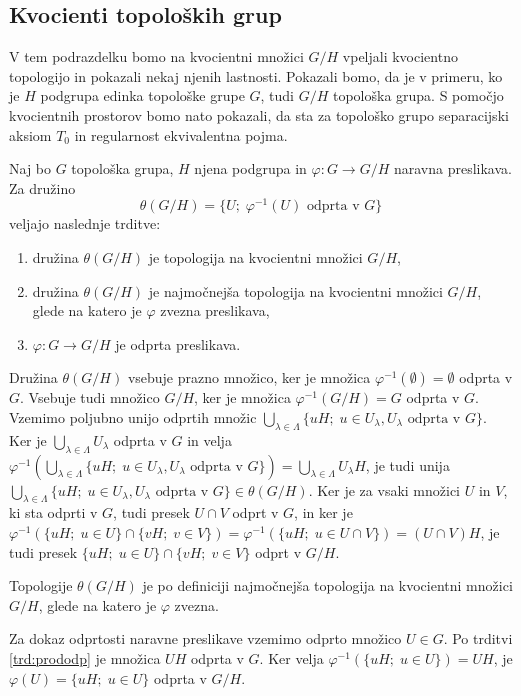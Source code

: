 \documentclass[mat1]{fmfdelo}
\begin{document}
\subsection{Kvocienti topoloških grup}
V tem podrazdelku bomo na kvocientni množici $G/H$ vpeljali kvocientno topologijo in pokazali nekaj njenih lastnosti. Pokazali bomo, da je v primeru, ko je $H$ podgrupa edinka topološke grupe $G$, tudi $G/H$ topološka grupa. S pomočjo kvocientnih prostorov bomo nato pokazali, da sta za topološko grupo separacijski aksiom $T_0$ in regularnost ekvivalentna pojma.

\begin{izrek}\label{izr:topkvocienta}
Naj bo $G$ topološka grupa, $H$ njena podgrupa in $\varphi\colon G \to G/H$ naravna preslikava. Za družino \[\theta(G/H) = \lbrace U ;\; \varphi^{-1}(U) \text{ odprta v } G \rbrace\]
veljajo naslednje trditve:
\begin{enumerate}
\item družina $\theta(G/H)$ je topologija na kvocientni množici $G/H$,
\item družina $\theta(G/H)$ je najmočnejša topologija na kvocientni množici $G/H$, glede na katero je $\varphi$ zvezna preslikava,
\item $\varphi: G \to G/H$ je odprta preslikava.
\end{enumerate}
\end{izrek}

\begin{dokaz}
Družina $\theta(G/H)$ vsebuje prazno množico, ker je množica $\varphi^{-1}(\emptyset) = \emptyset$ odprta v $G$. Vsebuje tudi množico $G/H$, ker je množica $\varphi^{-1}(G/H) = G$ odprta v $G$. Vzemimo poljubno unijo odprtih množic $\bigcup_{\lambda \in \Lambda}\lbrace uH ;\; u \in U_\lambda, U_\lambda \text{ odprta v } G\rbrace$. Ker je $\bigcup_{\lambda \in \Lambda} U_\lambda$ odprta v $G$ in velja $\varphi^{-1}(\bigcup_{\lambda \in \Lambda}\lbrace uH ;\; u \in U_\lambda, U_\lambda \text{ odprta v } G\rbrace) = \bigcup_{\lambda \in \Lambda} U_\lambda H$, je tudi unija $\bigcup_{\lambda \in \Lambda}\lbrace uH ;\; u \in U_\lambda, U_\lambda \text{ odprta v } G\rbrace \in \theta(G/H)$. Ker je za vsaki množici $U$ in $V$, ki sta odprti v $G$, tudi presek $U \cap V$ odprt v $G$, in ker je $\varphi^{-1}(\lbrace uH ;\; u \in U\rbrace \cap \lbrace vH ;\; v \in V \rbrace) = \varphi^{-1}(\lbrace uH ;\; u \in U \cap V \rbrace) = (U \cap V)H$, je tudi presek $\lbrace uH ;\; u \in U\rbrace \cap \lbrace vH ;\; v \in V \rbrace$ odprt v $G/H$.

Topologije $\theta(G/H)$ je po definiciji najmočnejša topologija na kvocientni množici $G/H$, glede na katero je $\varphi$ zvezna.

Za dokaz odprtosti naravne preslikave vzemimo odprto množico $U \in G$. Po trditvi \ref{trd:prododp} je množica $UH$ odprta v $G$. Ker velja $\varphi^{-1}(\lbrace uH ;\; u \in U \rbrace) = UH$, je $\varphi(U) = \lbrace uH ;\; u \in U \rbrace$ odprta v $G/H$.
\end{dokaz}
\end{document}
